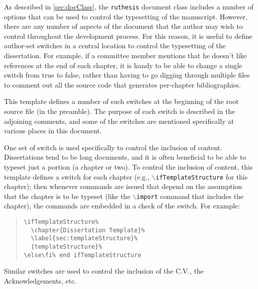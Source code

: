 As described in \autoref{sec:docClass}, the \texttt{ruthesis} document class includes a number of options that can be used to control the typesetting of the manuscript.
However, there are any number of aspects of the document that the author may wish to control throughout the development process.
For this reason, it is useful to define author-set switches in a central location to control the typesetting of the dissertation.
For example, if a committee member mentions that he doesn't like references at the end of each chapter, it is handy to be able to change a single switch from true to false, rather than having to go digging through multiple files to comment out all the source code that generates per-chapter bibliographies.

This template defines a number of such switches at the beginning of the root source file (in the preamble).
The purpose of each switch is described in the adjoining comments, and some of the switches are mentioned specifically at various places in this document.

One set of switch is used specifically to control the inclusion of content.
Dissertations tend to be long documents, and it is often beneficial to be able to typeset just a portion (a chapter or two).
To control the inclusion of content, this template defines a switch for each chapter (e.g., $\backslash$\texttt{ifTemplateStructure} for this chapter);
then whenever commands are issued that depend on the assumption that the chapter is to be typeset (like the $\backslash${\texttt{import}} command that includes the chapter), the commands are embedded in a check of the switch.
For example:
\begin{quotation}%
\begin{verbatim}
\ifTemplateStructure%
  \chapter{Dissertation Template}%
  \label{sec:templateStructure}%
  {templateStructure}%
\else\fi% end ifTemplateStructure
\end{verbatim}%
\end{quotation}%
Similar switches are used to control the inclusion of the C.V., the Acknowledgements, etc.
 
